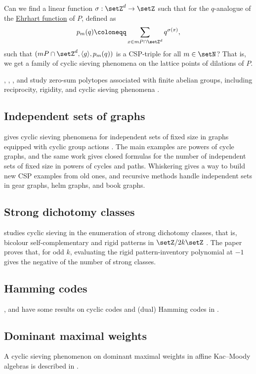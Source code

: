 Can we find a linear function $\sigma:\setZ^d \to \setZ$ such that for the
$q$-analogue of the \hyperref[ehrhart]{Ehrhart function} of $P$, defined as
\[
p_m(q) \coloneqq \sum_{x \in mP \cap \setZ^d} q^{\sigma(x)},
\]
such that $(mP \cap \setZ^d, \langle g \rangle, p_m(q))$ is a CSP-triple
for all $m \in \setN$?
That is, we get a family of cyclic sieving phenomena on the lattice points of dilations of $P$.

, , , and
 study zero-sum polytopes associated with finite abelian
groups, including reciprocity, rigidity, and cyclic sieving phenomena
\cite{HanWangZhangZhang2026x}.


\subsection[cspIndependentSetsGraphs]{Independent sets of graphs}

 gives cyclic sieving phenomena for independent sets of
fixed size in graphs equipped with cyclic group actions \cite{White2026x}.
The main examples are powers of cycle graphs, and the same work gives closed
formulas for the number of independent sets of fixed size in powers of cycles
and paths.  Whiskering gives a way to build new CSP examples from old ones,
and recursive methods handle independent sets in gear graphs, helm graphs,
and book graphs.


\subsection[cspStrongDichotomy]{Strong dichotomy classes}

 studies cyclic sieving in the
enumeration of strong dichotomy classes, that is, bicolour self-complementary
and rigid patterns in $\setZ/2k\setZ$ \cite{AgustinAquino2026x}.  The paper
proves that, for odd $k$, evaluating the rigid pattern-inventory polynomial
at $-1$ gives the negative of the number of strong classes.


\subsection[cspCyclicCodes]{Hamming codes}

,  and  
have some results on cyclic codes and (dual) Hamming codes in \cite{MasonReinerSridhar2020x}.


\subsection[cspMaximalWeights]{Dominant maximal weights}

A cyclic sieving phenomenon on dominant maximal weights in affine Kac--Moody
algebras is described in \cite{KimOhOh2020}.
